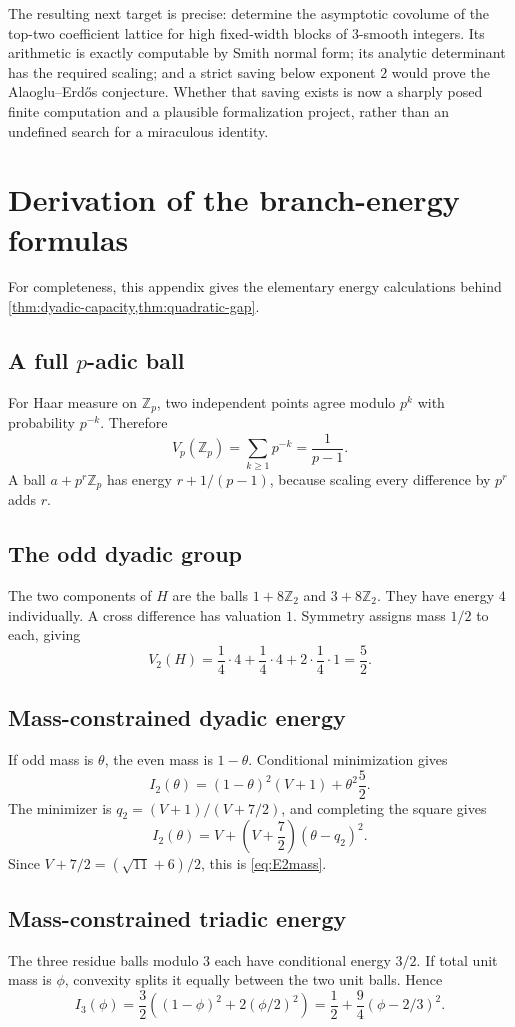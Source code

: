 \documentclass[11pt]{article}
\theoremstyle{definition}
\theoremstyle{remark}
\newcommand{\Z}{\mathbb Z}
\begin{document}
The resulting next target is precise: determine the asymptotic covolume of the top-two coefficient lattice for high fixed-width blocks of $3$-smooth integers.  Its arithmetic is exactly computable by Smith normal form; its analytic determinant has the required scaling; and a strict saving below exponent $2$ would prove the Alaoglu--Erd\H{o}s conjecture.  Whether that saving exists is now a sharply posed finite computation and a plausible formalization project, rather than an undefined search for a miraculous identity.

\appendix
\section{Derivation of the branch-energy formulas}

For completeness, this appendix gives the elementary energy calculations behind \cref{thm:dyadic-capacity,thm:quadratic-gap}.

\subsection{A full $p$-adic ball}
For Haar measure on $\Z_p$, two independent points agree modulo $p^k$ with probability $p^{-k}$.  Therefore
\[
       V_p(\Z_p)=\sum_{k\ge1}p^{-k}=\frac1{p-1}.
\]
A ball $a+p^r\Z_p$ has energy $r+1/(p-1)$, because scaling every difference by $p^r$ adds $r$.

\subsection{The odd dyadic group}
The two components of $H$ are the balls $1+8\Z_2$ and $3+8\Z_2$.  They have energy $4$ individually.  A cross difference has valuation $1$.  Symmetry assigns mass $1/2$ to each, giving
\[
       V_2(H)=\frac14\cdot4+\frac14\cdot4
             +2\cdot\frac14\cdot1=\frac52.
\]

\subsection{Mass-constrained dyadic energy}
If odd mass is $\theta$, the even mass is $1-\theta$.  Conditional minimization gives
\[
 I_2(\theta)=(1-\theta)^2(V+1)+\theta^2\frac52.
\]
The minimizer is $q_2=(V+1)/(V+7/2)$, and completing the square gives
\[
 I_2(\theta)=V+\left(V+\frac72\right)(\theta-q_2)^2.
\]
Since $V+7/2=(\sqrt{11}+6)/2$, this is \eqref{eq:E2mass}.

\subsection{Mass-constrained triadic energy}
The three residue balls modulo $3$ each have conditional energy $3/2$.  If total unit mass is $\phi$, convexity splits it equally between the two unit balls.  Hence
\[
 I_3(\phi)=\frac32\left((1-\phi)^2+2(\phi/2)^2\right)
 =\frac12+\frac94(\phi-2/3)^2.
\]
\end{document}
